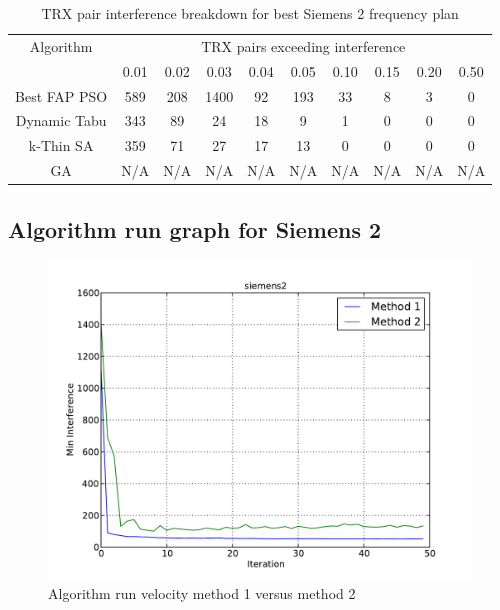 \begin{table}[H]
\centering
	\begin{tabular}{cccccccccc}
	\toprule
    Algorithm & \multicolumn{9}{c}{TRX pairs exceeding interference}\\
    & 0.01 & 0.02 & 0.03 & 0.04 & 0.05 & 0.10 & 0.15 & 0.20 & 0.50 \\
    \midrule
    Best FAP PSO & 589 & 208 & 1400 & 92 & 193 & 33 & 8 & 3 & 0\\
    Dynamic Tabu & 343 & 89 & 24 & 18 & 9 & 1 & 0 & 0 & 0\\
    k-Thin SA & 359 & 71 & 27 & 17 & 13 & 0 & 0 & 0 & 0\\
    GA & \scriptsize{N/A} & \scriptsize{N/A} & \scriptsize{N/A} & \scriptsize{N/A} & \scriptsize{N/A} & \scriptsize{N/A} & \scriptsize{N/A} & \scriptsize{N/A} & \scriptsize{N/A}\\
    \bottomrule
	\end{tabular}
\caption{TRX pair interference breakdown for best Siemens 2 frequency plan}
\label{tab:breakdown-siem2m1}
\end{table}

\subsection{Algorithm run graph for Siemens 2}
\begin{figure}[H]
	\begin{centering}
    \includegraphics[scale=0.5]{../Implementation/data-cruncher/graph/Siemens2.pdf}
	\caption{Algorithm run velocity method 1 versus method 2}
	\label{fig:siem2graph}
	\end{centering}
\end{figure}


